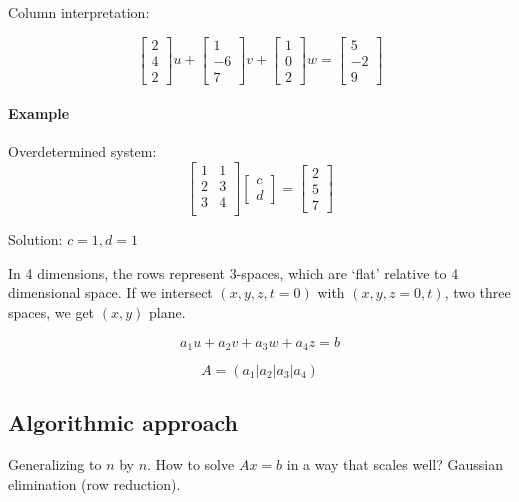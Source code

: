 \documentclass[12pt]{article}
\newcommand{\<}{\langle}
\renewcommand{\>}{\rangle}
\begin{document}
Column interpretation:

\[
	\begin{bmatrix}
		2 \\ 4 \\ 2
	\end{bmatrix} u + 
	\begin{bmatrix}
		1 \\ -6 \\ 7
	\end{bmatrix} v + 
	\begin{bmatrix}
		1 \\ 0 \\ 2
	\end{bmatrix} w =
	\begin{bmatrix}
		5 \\ -2 \\ 9
	\end{bmatrix}
\]

\paragraph{Example} Overdetermined system:
\[
	\begin{bmatrix}
		1 & 1 \\
		2 & 3 \\
		3 & 4 \\
	\end{bmatrix}
	\begin{bmatrix}
		c \\ d
	\end{bmatrix} = 
	\begin{bmatrix}
		2 \\ 5 \\ 7
	\end{bmatrix}
\]

Solution: $c = 1, d = 1$

In 4 dimensions, the rows represent 3-spaces, which are `flat' relative to 4 dimensional space. If we intersect $(x,y,z,t=0)$ with $(x,y,z=0,t)$, two three spaces, we get $(x,y)$ plane.

\[
	a_1 u + a_2 v + a_3 w + a_4 z = b
\]

\[
	A = (a_1 | a_2 | a_3 | a_4)
\]

\subsection{Algorithmic approach}
Generalizing to $n$ by $n$. How to solve $Ax = b$ in a way that scales well? Gaussian elimination (row reduction).
\end{document}
